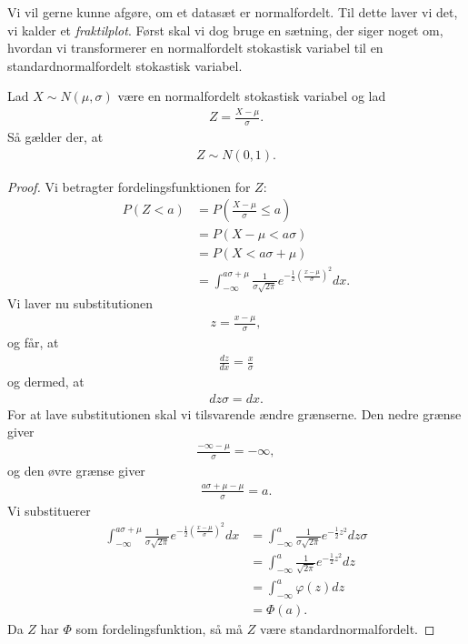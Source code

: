 Vi vil gerne kunne afgøre, om et datasæt er normalfordelt. Til dette laver vi det, vi kalder et \textit{fraktilplot}. Først skal vi dog bruge en sætning, der siger noget om, hvordan vi transformerer en normalfordelt stokastisk variabel til en standardnormalfordelt stokastisk variabel. 

\begin{setn}
	Lad $X \sim N(\mu, \sigma)$ være en normalfordelt stokastisk variabel og lad
	\begin{align*}
		Z = \frac{X-\mu}{\sigma}.
	\end{align*}
	Så gælder der, at 
	\begin{align*}
		Z \sim N(0,1).
	\end{align*}
\end{setn}
\begin{proof}
	Vi betragter fordelingsfunktionen for $Z$:
	\begin{align*}
		P(Z<a) &= P(\frac{X-\mu}{\sigma} \leq a)\\
		&= P(X-\mu < a\sigma)\\
		&= P(X < a\sigma+\mu)\\
		&= \int_{-\infty}^{a\sigma+\mu}\frac{1}{\sigma\sqrt{2\pi}}e^{-\frac{1}{2}\left(\frac{x-\mu}{\sigma}\right)^2}dx.
	\end{align*}
	Vi laver nu substitutionen 
	\begin{align*}
		z = \frac{x-\mu}{\sigma},
	\end{align*}
	og får, at
	\begin{align*}
		\frac{dz}{dx} = \frac{x}{\sigma}
	\end{align*}
	og dermed, at 
	\begin{align*}
		dz\sigma = dx.
	\end{align*}
	For at lave substitutionen skal vi tilsvarende ændre grænserne. Den nedre grænse giver
	\begin{align*}
		\frac{-\infty - \mu}{\sigma} = -\infty,
	\end{align*}
	og den øvre grænse giver
	\begin{align*}
		\frac{a\sigma+\mu -\mu}{\sigma} = a.
	\end{align*}
	Vi substituerer
	\begin{align*}
		\int_{-\infty}^{a\sigma+\mu}\frac{1}{\sigma\sqrt{2\pi}}e^{-\frac{1}{2}\left(\frac{x-\mu}{\sigma}\right)^2}dx &= 
		\int_{-\infty}^a\frac{1}{\sigma\sqrt{2\pi}}e^{-\frac{1}{2}z^2}dz\sigma\\
		&=\int_{-\infty}^a\frac{1}{\sqrt{2\pi}}e^{-\frac{1}{2}z^2}dz\\
		&= \int_{-\infty}^a\varphi(z)dz \\
		&= \Phi(a).
	\end{align*}
	Da $Z$ har $\Phi$ som fordelingsfunktion, så må $Z$ være standardnormalfordelt. 
\end{proof}

